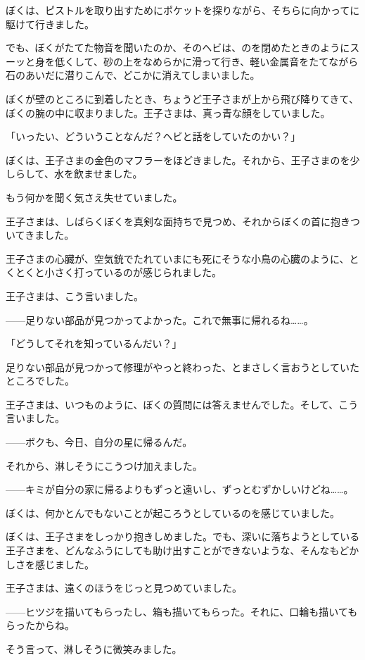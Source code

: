 ぼくは、ピストルを取り出すためにポケットを探りながら、そちらに向かってに駆けて行きました。

でも、ぼくがたてた物音を聞いたのか、そのヘビは、のを閉めたときのようにスーッと身を低くして、砂の上をなめらかに滑って行き、軽い金属音をたてながら石のあいだに潜りこんで、どこかに消えてしまいました。

ぼくが壁のところに到着したとき、ちょうど王子さまが上から飛び降りてきて、ぼくの腕の中に収まりました。王子さまは、真っ青な顔をしていました。

「いったい、どういうことなんだ？ヘビと話をしていたのかい？」

ぼくは、王子さまの金色のマフラーをほどきました。それから、王子さまのを少しらして、水を飲ませました。

もう何かを聞く気さえ失せていました。

王子さまは、しばらくぼくを真剣な面持ちで見つめ、それからぼくの首に抱きついてきました。

王子さまの心臓が、空気銃でたれていまにも死にそうな小鳥の心臓のように、とくとくと小さく打っているのが感じられました。

王子さまは、こう言いました。

——足りない部品が見つかってよかった。これで無事に帰れるね……。

「どうしてそれを知っているんだい？」

足りない部品が見つかって修理がやっと終わった、とまさしく言おうとしていたところでした。

王子さまは、いつものように、ぼくの質問には答えませんでした。そして、こう言いました。

——ボクも、今日、自分の星に帰るんだ。

それから、淋しそうにこうつけ加えました。

——キミが自分の家に帰るよりもずっと遠いし、ずっとむずかしいけどね……。

ぼくは、何かとんでもないことが起ころうとしているのを感じていました。

ぼくは、王子さまをしっかり抱きしめました。でも、深いに落ちようとしている王子さまを、どんなふうにしても助け出すことができないような、そんなもどかしさを感じました。

王子さまは、遠くのほうをじっと見つめていました。

——ヒツジを描いてもらったし、箱も描いてもらった。それに、口輪も描いてもらったからね。

そう言って、淋しそうに微笑みました。

